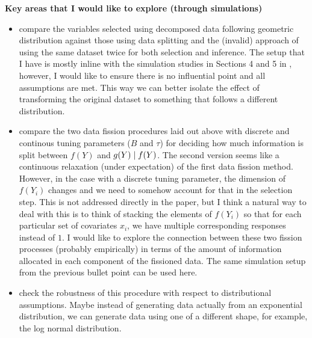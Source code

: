 \textbf{Key areas that I would like to explore (through simulations)}
\begin{itemize}
\item compare the variables selected using decomposed data following geometric distribution against those using data splitting and the (invalid) approach of using the same dataset twice for both selection and inference. The setup that I have is mostly inline with the simulation studies in Sections 4 and 5 in \cite{leiner2022data}, however, I would like to ensure there is no influential point and all assumptions are met. This way we can better isolate the effect of transforming the original dataset to something that follows a different distribution.
\item compare the two data fission procedures laid out above with discrete and continous tuning parameters ($B$ and $\tau$) for deciding how much information is split between $f(Y)$ and $g(Y)\mid f(Y)$. The second version seems like a continuous relaxation (under expectation) of the first data fission method. However, in the case with a discrete tuning parameter, the dimension of $f(Y_i)$ changes and we need to somehow account for that in the selection step. This is not addressed directly in the paper, but I think a natural way to deal with this is to think of stacking the elements of $f(Y_i)$ so that for each particular set of covariates $x_i$, we have multiple corresponding responses instead of $1$. I would like to explore the connection between these two fission processes (probably empirically) in terms of the amount of information allocated in each component of the fissioned data. The same simulation setup from the previous bullet point can be used here.
\item check the robustness of this procedure with respect to distributional assumptions. Maybe instead of generating data actually from an exponential distribution, we can generate data using one of a different shape, for example, the log normal distribution.
\end{itemize}